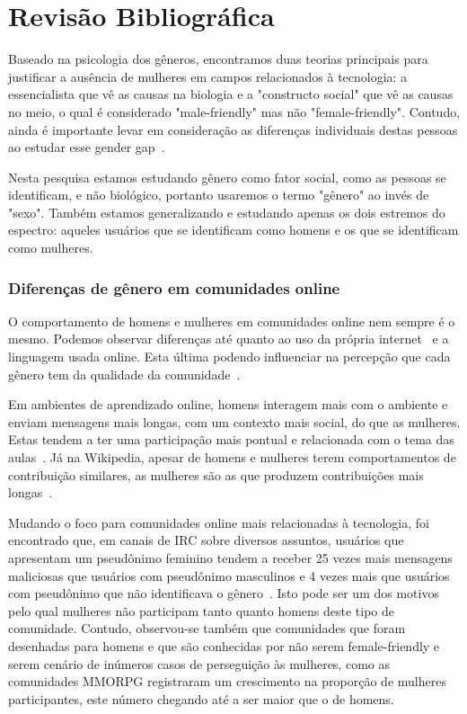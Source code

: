 \chapter{Revisão Bibliográfica}

Baseado na psicologia dos gêneros, encontramos duas teorias principais para justificar a ausência de mulheres em campos relacionados à tecnologia: a essencialista que vê as causas na biologia e a "constructo social" que vê as causas no meio, o qual é considerado "male-friendly" mas não "female-friendly". Contudo, ainda é importante levar em consideração as diferenças individuais destas pessoas ao estudar esse gender gap~\cite{trauth2004understanding}.

Nesta pesquisa estamos estudando gênero como fator social, como as pessoas se identificam, e não biológico, portanto usaremos o termo "gênero" ao invés de "sexo". Também estamos generalizando e estudando apenas os dois estremos do espectro: aqueles usuários que se identificam como homens e os que se identificam como mulheres. 

\subsection{Diferenças de gênero em comunidades online}

O comportamento de homens e mulheres em comunidades online nem sempre é o mesmo. Podemos observar diferenças até quanto ao uso da própria internet~\cite{hargittai2006differences} e a linguagem usada online. Esta última podendo influenciar na percepção que cada gênero tem da qualidade da comunidade~\cite{Gefen:2005:YSS:1066149.1066156}.

Em ambientes de aprendizado online, homens interagem mais com o ambiente e enviam mensagens mais longas, com um contexto mais social, do que as mulheres. Estas tendem a ter uma participação mais pontual e relacionada com o tema das aulas~\cite{barrett1999gender}. Já na Wikipedia, apesar de homens e mulheres terem comportamentos de contribuição similares, as mulheres são as que produzem contribuições mais longas~\cite{glott2010wikipedia}.

Mudando o foco para comunidades online mais relacionadas à tecnologia, foi encontrado que, em canais de IRC sobre diversos assuntos, usuários que apresentam um pseudônimo feminino tendem a receber 25 vezes mais mensagens maliciosas que usuários com pseudônimo masculinos e 4 vezes mais que usuários com pseudônimo que não identificava o gênero~\cite{meyer2006assessing}. Isto pode ser um dos motivos pelo qual mulheres não participam tanto quanto homens deste tipo de comunidade. Contudo, observou-se também que comunidades que foram desenhadas para homens e que são conhecidas por não serem female-friendly e serem cenário de inúmeros casos de perseguição às mulheres, como as comunidades MMORPG registraram um crescimento na proporção de mulheres participantes, este número chegando até a ser maior que o de homens. 

